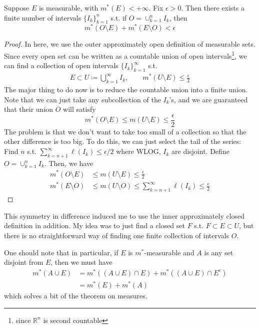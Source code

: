   \begin{theorem}
    Suppose $E$ is measurable, with $m^\ast (E) < +\infty$. Fix $\epsilon > 0$. Then there exists a finite number of intervals $\{I_k\}_{k=1}^n$ s.t. if $O = \cup_{ k=1}^n I_k$, then 
    \begin{equation}
      m^\ast (O \setminus E) + m^\ast (E \setminus O) < \epsilon
    \end{equation}
  \end{theorem}
  \begin{proof}
    In here, we use the outer approximately open definition of measurable sets. Since every open set can be written as a countable union of open intervals\footnote{since $\mathbb{R}^n$ is second countable}, we can find a collection of open intervals $\{I_k\}_{k=1}^\infty$ s.t. 
    \begin{align}
      E \subset U \coloneqq \bigcup_{k=1}^\infty I_k, \qquad m^\ast(U \setminus E) \leq \frac{\epsilon}{2}
    \end{align}
    The major thing to do now is to reduce the countable union into a finite union. Note that we can just take any subcollection of the $I_k$'s, and we are guaranteed that their union $O$ will satisfy 
    \begin{equation}
      m^\ast(O \setminus E) \leq m(U \setminus E) \leq \frac{\epsilon}{2}
    \end{equation}
    The problem is that we don't want to take too small of a collection so that the other difference is too big. To do this, we can just select the tail of the series: Find $n$ s.t. $\sum_{k=n+1}^\infty \ell(I_k) \leq \epsilon/2$ where WLOG, $I_k$ are disjoint. Define $O = \cup_{k=1}^n I_k$. Then, we have 
    \begin{align}
      m^\ast (O \setminus E) & \leq m(U \setminus E) \leq \frac{\epsilon}{2} \\ 
      m^\ast (E \setminus O) & \leq m(U \setminus O) \leq \sum_{k=n+1}^\infty \ell(I_k) \leq \frac{\epsilon}{2}
    \end{align}
  \end{proof}

  This symmetry in difference induced me to use the inner approximately closed definition in addition. My idea was to just find a closed set $F$ s.t. $F \subset E \subset U$, but there is no straightforward way of finding one finite collection of intervals $O$. 

  \begin{example}
    One should note that in particular, if $E$ is $m^\ast$-measurable and $A$ is any set disjoint from $E$, then we must have 
    \begin{align}
      m^\ast (A \cup E) & = m^\ast ((A \cup E) \cap E) + m^\ast ((A \cup E) \cap E^c) \\ 
                          & = m^\ast (E) + m^\ast (A)
    \end{align}
    which solves a bit of the theorem on measures. 
  \end{example}

